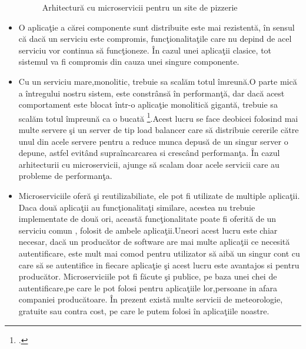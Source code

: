 \documentclass[a4paper,12pt]{report}
\begin{document}
\begin{itemize}
\begin{figure}[!htb]
		      \caption{Arhitectur\u a cu microservicii pentru un site de pizzerie}
		      \label{fig:PizzaMicroservicii}
	      \end{figure}
	\item O aplica\c tie a c\u arei componente sunt distribuite este mai rezistent\u a, \^in sensul c\u a dac\u a un
	      serviciu este compromis, func\c tionalita\c tile care nu depind de acel serviciu vor continua s\u a func\c tioneze.
	      \^In cazul unei aplica\c tii clasice, tot sistemul va fi compromis din cauza unei singure componente.
	\item Cu un serviciu mare,monolitic, trebuie sa scal\u am totul \^imreun\u a.O parte mic\u a
	      a \^intregului nostru sistem, este constr\^ans\u a \^in performan\c t\u a, dar dac\u a
	      acest comportament este blocat \^intr-o aplica\c tie monolitic\u a gigant\u a, trebuie sa scal\u am totul \^impreun\u a
	      ca o bucat\u a \footcite{buildingMicroservices5}.Acest lucru se face deobicei folosind mai multe servere
	      \c si un server de tip load balancer care s\u a distribuie cererile c\u atre unul din acele servere pentru
	      a reduce munca depus\u a de un singur server o depune, astfel evit\^and supra\^incarcarea si cresc\^and performan\c ta.
	      \^In cazul arhitecturii cu microservicii, ajunge s\u a scalam doar acele servicii care au probleme de performan\c ta.
	\item Microserviciile ofer\u a \c si reutilizabiliate, ele pot fi utilizate de multiple aplica\c tii.
		  Daca dou\u a aplica\c tii au func\c tionalita\c ti similare, acestea nu trebuie implementate de dou\u a ori, aceast\u a func\c tionalitate
		  poate fi oferit\u a de un serviciu comun , folosit de ambele aplica\c tii.Uneori acest lucru este chiar necesar, dac\u a un produc\u ator de software
		  are mai multe aplica\c tii ce necesit\u a autentificare, este mult mai comod pentru utilizator s\u a aib\u a un singur cont cu care s\u a se autentifice in fiecare aplica\c tie 
		  \c si acest lucru este avantajos si pentru produc\u ator.
		  Microserviciile pot fi f\u acute \c si publice, pe baza unei chei de autentificare,pe care le pot folosi pentru aplica\c tiile lor,persoane in afara companiei produc\u atoare.
		  \^In prezent exist\u a multe servicii de meteorologie, gratuite sau contra cost, pe care le putem folosi \^in aplica\c tiile noastre.
\end{itemize}
\end{document}
